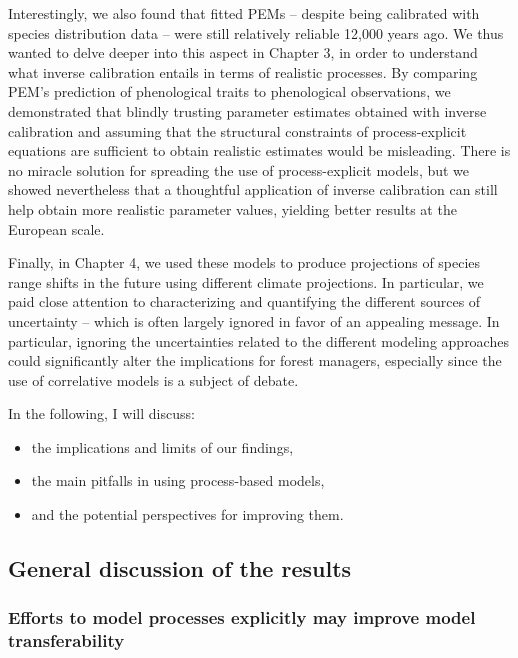 Interestingly, we also found that fitted PEMs -- despite being calibrated with species distribution data -- were still relatively reliable 12,000 years ago. We thus wanted to delve deeper into this aspect in Chapter 3, in order to understand what inverse calibration entails in terms of realistic processes. By comparing PEM's prediction of phenological traits to phenological observations, we demonstrated that blindly trusting parameter estimates obtained with inverse calibration and assuming that the structural constraints of process-explicit equations are sufficient to obtain realistic estimates would be misleading. There is no miracle solution for spreading the use of process-explicit models, but we showed nevertheless that a thoughtful application of inverse calibration can still help obtain more realistic parameter values, yielding better results at the European scale.

Finally, in Chapter 4, we used these models to produce projections of species range shifts in the future using different climate projections. In particular, we paid close attention to characterizing and quantifying the different sources of uncertainty -- which is often largely ignored in favor of an appealing message. In particular, ignoring the uncertainties related to the different modeling approaches could significantly alter the implications for forest managers, especially since the use of correlative models is a subject of debate.

In the following, I will discuss:
\begin{itemize}
\item the implications and limits of our findings,
\item the main pitfalls in using process-based models,
\item  and the potential perspectives for improving them.
\end{itemize}

\subsection{General discussion of the results}

\subsubsection{Efforts to model processes explicitly  may improve model transferability}

